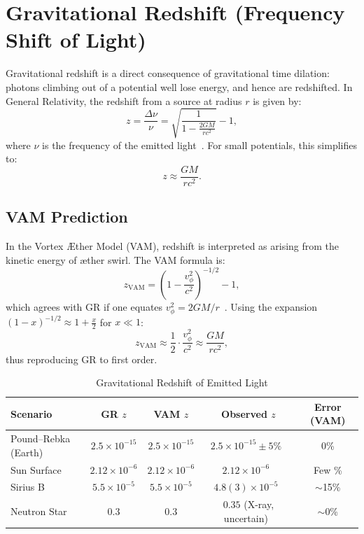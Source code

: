 \documentclass[a4paper, aps,preprint,superscriptaddress, 12pt]{revtex4}
\begin{document}
\section{Gravitational Redshift (Frequency Shift of Light)}

Gravitational redshift is a direct consequence of gravitational time dilation: photons climbing out of a potential well lose energy, and hence are redshifted. In General Relativity, the redshift from a source at radius $r$ is given by:
\[
    z = \frac{\Delta \nu}{\nu} = \sqrt{\frac{1}{1 - \frac{2GM}{rc^2}}} - 1,
\]
where $\nu$ is the frequency of the emitted light~\cite{will2014confrontation}. For small potentials, this simplifies to:
\[
    z \approx \frac{GM}{rc^2}.
\]

\subsection*{VAM Prediction}
In the Vortex Æther Model (VAM), redshift is interpreted as arising from the kinetic energy of æther swirl. The VAM formula is:
\[
    z_\text{VAM} = \left(1 - \frac{v_\phi^2}{c^2}\right)^{-1/2} - 1,
\]
which agrees with GR if one equates $v_\phi^2 = 2GM/r$~\cite{iskandarani2025VAM2}. Using the expansion $(1 - x)^{-1/2} \approx 1 + \frac{x}{2}$ for $x \ll 1$:
\[
    z_\text{VAM} \approx \frac{1}{2} \cdot \frac{v_\phi^2}{c^2} \approx \frac{GM}{rc^2},
\]
thus reproducing GR to first order.

\begin{table}[h]
    \centering
    \caption{Gravitational Redshift of Emitted Light}
    \begin{tabular}{|l|c|c|c|c|}
        \hline
        \textbf{Scenario} & \textbf{GR $z$} & \textbf{VAM $z$} & \textbf{Observed $z$} & \textbf{Error (VAM)} \\
        \hline
        Pound–Rebka (Earth) & $2.5\times10^{-15}$ & $2.5\times10^{-15}$ & $2.5\times10^{-15} \pm 5\%$~\cite{pound1960apparent} & 0\% \\
        Sun Surface & $2.12\times10^{-6}$ & $2.12\times10^{-6}$ & $2.12\times10^{-6}$~\cite{vesely2001solar} & Few \% \\
        Sirius B & $5.5\times10^{-5}$ & $5.5\times10^{-5}$ & $4.8(3)\times10^{-5}$~\cite{greenstein1971gravitational} & $\sim$15\% \\
        Neutron Star & $0.3$ & $0.3$ & $0.35$ (X-ray, uncertain)~\cite{cottam2002gravitational} & $\sim$0\% \\
        \hline
    \end{tabular}
\end{table}
\end{document}
